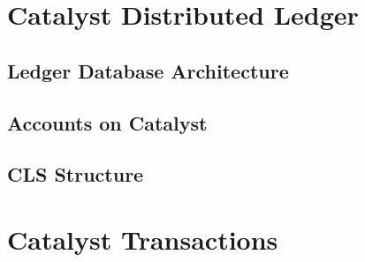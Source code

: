 \documentclass[a4paper, 12pt]{book}
\begin{document}



%



\chapter{Catalyst Distributed Ledger} \label{Cha:LDA}


\section{Ledger Database Architecture} \label{Sec:LDA}



\section{Accounts on Catalyst} \label{Sec:AoC}



\section{CLS Structure}\label{SecLCS}


	

%


\chapter{Catalyst Transactions} \label{Cha:Tra}
\end{document}

